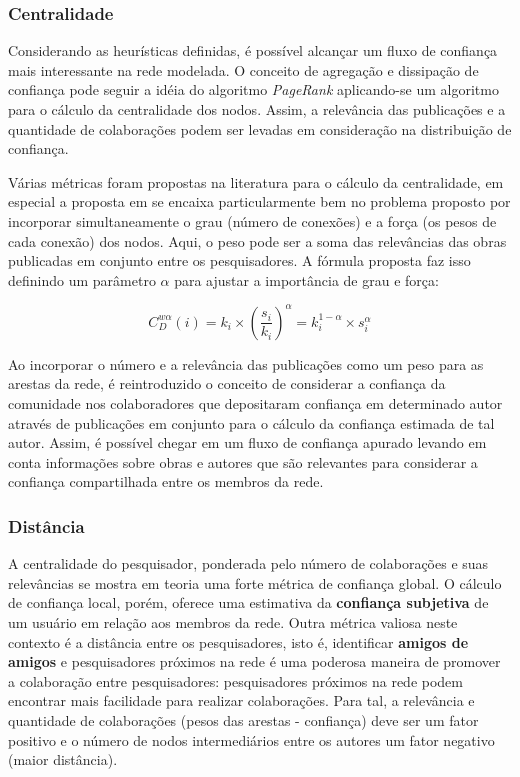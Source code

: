\documentclass[12pt]{article}
\begin{document}
\subsubsection{Centralidade}

Considerando as heurísticas definidas, é possível alcançar um fluxo de confiança mais interessante na rede modelada. O conceito 
de agregação e dissipação de confiança pode seguir a idéia do algoritmo \textit{PageRank} aplicando-se um algoritmo para o 
cálculo da centralidade dos nodos. Assim, a relevância das publicações e a quantidade de colaborações podem ser levadas em 
consideração na distribuição de confiança.

Várias métricas foram propostas na literatura para o cálculo da centralidade, em especial a proposta em \cite{opsahl2010node} 
se encaixa particularmente bem no problema proposto por incorporar simultaneamente o grau (número de conexões) e a força 
(os pesos de cada conexão) dos nodos. Aqui, o peso pode ser a soma das relevâncias das obras publicadas em conjunto entre os 
pesquisadores. A fórmula proposta faz isso definindo um parâmetro $\alpha$ para ajustar a importância de grau e força:

\begin{equation} \label{eqn:centrality} 
 C_D ^{w \alpha} (i) = k_i \times \left( \frac {s_i} {k_i} \right) ^{\alpha} = k_i ^{1 - \alpha} \times s _i ^{\alpha}
\end{equation}

Ao incorporar o número e a relevância das publicações como um peso para as arestas da rede, é reintroduzido o conceito de 
considerar a confiança da comunidade nos colaboradores que depositaram confiança em determinado autor através de publicações 
em  conjunto para o cálculo da confiança estimada de tal autor. Assim, é possível chegar em um fluxo de confiança apurado 
levando em conta informações sobre obras e autores que são relevantes para considerar a confiança compartilhada entre 
os membros da rede.

\subsubsection{Distância} \label{sect:distance}

A centralidade do pesquisador, ponderada pelo número de colaborações e suas relevâncias se mostra em teoria uma forte métrica de 
confiança global. O cálculo de confiança local, porém, oferece uma estimativa da \textbf{confiança subjetiva} de um usuário em 
relação aos membros da rede. Outra métrica valiosa neste contexto é a distância entre  os pesquisadores, isto é, identificar 
\textbf{amigos de amigos} e pesquisadores próximos na rede é uma poderosa maneira de promover a colaboração entre pesquisadores: 
pesquisadores próximos na rede podem encontrar mais facilidade para realizar colaborações. Para tal, a relevância e quantidade de 
colaborações (pesos das arestas - confiança) deve ser um fator positivo e o número de nodos intermediários entre os autores um 
fator negativo (maior distância).
\end{document}
